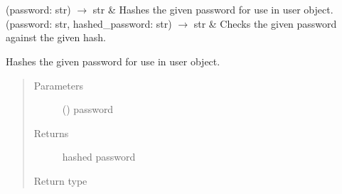 \documentclass[letterpaper,10pt,english]{sphinxmanual}
\begin{document}
\begin{savenotes}\sphinxatlongtablestart\begin{longtable}[c]{}
\hline

\endfirsthead

%
{}\\
\hline

\endhead

\hline
{}\\
\endfoot

\endlastfoot

\sphinxAtStartPar
{\hyperref[\detokenize{autoapi/pine/client/password/index:pine.client.password.hash_password}]{}}(password: str) \(\rightarrow\) str
&
\sphinxAtStartPar
Hashes the given password for use in user object.
\\
\hline
\sphinxAtStartPar
{\hyperref[\detokenize{autoapi/pine/client/password/index:pine.client.password.check_password}]{}}(password: str, hashed\_password: str) \(\rightarrow\) str
&
\sphinxAtStartPar
Checks the given password against the given hash.
\\
\hline
\end{longtable}\sphinxatlongtableend\end{savenotes}

\begin{fulllineitems}
\label{\detokenize{autoapi/pine/client/password/index:pine.client.password.hash_password}}
\sphinxAtStartPar
Hashes the given password for use in user object.
\begin{quote}\begin{description}
\item[{Parameters}] \leavevmode
\sphinxAtStartPar
{} () \textendash{} password

\item[{Returns}] \leavevmode
\sphinxAtStartPar
hashed password

\item[{Return type}] \leavevmode
\sphinxAtStartPar
{}

\end{description}\end{quote}

\end{fulllineitems}
\end{document}
